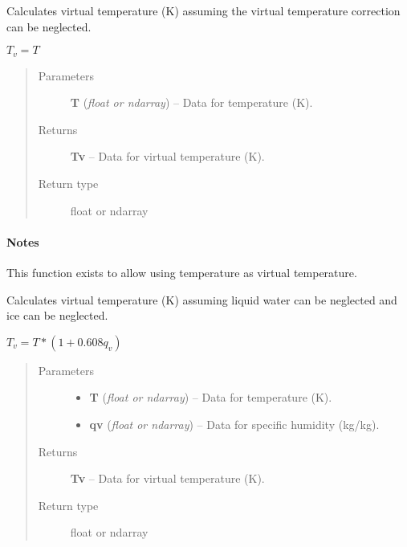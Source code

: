 \documentclass[letterpaper,10pt,english]{sphinxmanual}
\begin{document}
\begin{fulllineitems}
\label{atmos:atmos.equations.Tv_from_T_assuming_Tv_equals_T}
Calculates virtual temperature (K) assuming the virtual temperature correction
can be neglected.

\(T_v = T\)
\begin{quote}\begin{description}
\item[{Parameters}] \leavevmode
\textbf{T} (\emph{float or ndarray}) -- Data for temperature (K).

\item[{Returns}] \leavevmode
\textbf{Tv} --
Data for virtual temperature (K).

\item[{Return type}] \leavevmode
float or ndarray

\end{description}\end{quote}
\paragraph{Notes}

This function exists to allow using temperature as virtual temperature.

\end{fulllineitems}


\begin{fulllineitems}
\label{atmos:atmos.equations.Tv_from_T_qv}
Calculates virtual temperature (K) assuming liquid water can be neglected and
ice can be neglected.

\(T_v = T*(1+0.608 q_v)\)
\begin{quote}\begin{description}
\item[{Parameters}] \leavevmode\begin{itemize}
\item {} 
\textbf{T} (\emph{float or ndarray}) -- Data for temperature (K).

\item {} 
\textbf{qv} (\emph{float or ndarray}) -- Data for specific humidity (kg/kg).

\end{itemize}

\item[{Returns}] \leavevmode
\textbf{Tv} --
Data for virtual temperature (K).

\item[{Return type}] \leavevmode
float or ndarray

\end{description}\end{quote}

\end{fulllineitems}
\end{document}
